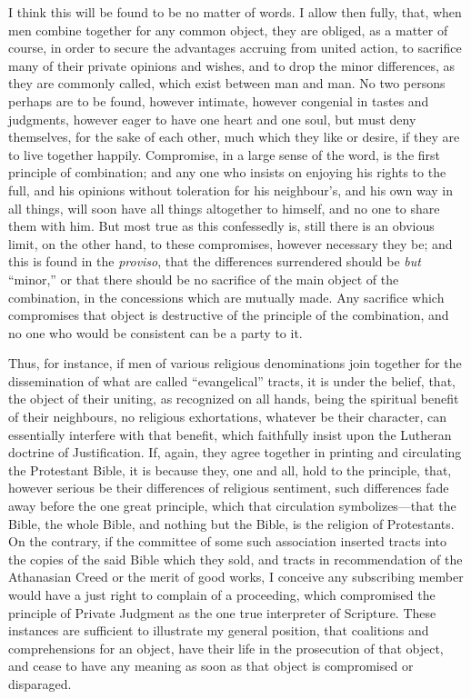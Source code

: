 I think this will be found to be no matter of words. I allow then
fully, that, when men combine together for any common object, they are
obliged, as a matter of course, in order to secure the advantages
accruing from united action, to sacrifice many of their private
opinions and wishes, and to drop the minor differences, as they are
commonly called, which exist between man and man. No two persons
perhaps are to be found, however intimate, however congenial in tastes
and judgments, however eager to have one heart and one soul, but must
deny themselves, for the sake of each other, much which they like or
desire, if they are to live together happily. Compromise, in a large
sense of the word, is the first principle of combination; and any one
who insists on enjoying his rights to the full, and his opinions
without toleration for his neighbour's, and his own way in all things,
will soon have all things altogether to himself, and no one to share
them with him. But most true as this confessedly is, still there is an
obvious limit, on the other hand, to these compromises, however
necessary they be; and this is found in the \emph{proviso}, that the
differences surrendered should be \emph{but} ``minor,'' or
that there should be no sacrifice of the main object of the
combination, in the concessions which are mutually made. Any sacrifice
which compromises that object is destructive of the principle of
the combination, and no one who would be consistent can be a party to
it.

Thus, for instance, if men of various religious denominations join
together for the dissemination of what are called
``evangelical'' tracts, it is under the belief, that, the
object of their uniting, as recognized on all hands, being the
spiritual benefit of their neighbours, no religious exhortations,
whatever be their character, can essentially interfere with that
benefit, which faithfully insist upon the Lutheran doctrine of
Justification. If, again, they agree together in printing and
circulating the Protestant Bible, it is because they, one and all,
hold to the principle, that, however serious be their differences of
religious sentiment, such differences fade away before the one great
principle, which that circulation symbolizes—that the Bible, the
whole Bible, and nothing but the Bible, is the religion of
Protestants. On the contrary, if the committee of some such
association inserted tracts into the copies of the said Bible which
they sold, and tracts in recommendation of the Athanasian Creed or the
merit of good works, I conceive any subscribing member would have a
just right to complain of a proceeding, which compromised the
principle of Private Judgment as the one true interpreter of
Scripture. These instances are sufficient to illustrate my general
position, that coalitions and comprehensions for an object, have their
life in the prosecution of that object, and cease to have any meaning
as soon as that object is compromised or disparaged.

